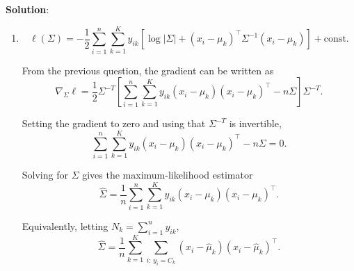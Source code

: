 \documentclass[submit]{harvardml}
\newenvironment{solution}{
    \vspace{2mm}
    \color{blue}\noindent\textbf{Solution}:
}{}
\begin{document}
\begin{solution}
\begin{enumerate}
\[
\frac{\partial}{\partial \Sigma}\log|\Sigma|
=
\Sigma^{-T},
\qquad
\frac{\partial}{\partial \Sigma}
\left[
(x-\mu)^\top \Sigma^{-1}(x-\mu)
\right]
=
-\Sigma^{-T}(x-\mu)(x-\mu)^\top\Sigma^{-T},
\]

we obtain

\[
\nabla_{\Sigma}\ell
=
-\frac{1}{2}
\left[
\sum_{i=1}^{n}\sum_{k=1}^{K}
y_{ik}\Sigma^{-T}
-
\sum_{i=1}^{n}\sum_{k=1}^{K}
y_{ik}
\Sigma^{-T}(x_i-\mu_k)(x_i-\mu_k)^\top\Sigma^{-T}
\right].
\]

Factoring out \(\Sigma^{-T}\),

\[
\nabla_{\Sigma}\ell
=
-\frac{1}{2}
\Sigma^{-T}
\left[
N I
-
\sum_{i=1}^{n}\sum_{k=1}^{K}
y_{ik}(x_i-\mu_k)(x_i-\mu_k)^\top
\Sigma^{-T}
\right].
\]

A cleaner equivalent expression is

\[
\nabla_{\Sigma}\ell
=
\frac{1}{2}
\Sigma^{-T}
\left[
\sum_{i=1}^{n}\sum_{k=1}^{K}
y_{ik}(x_i-\mu_k)(x_i-\mu_k)^\top
-
N\Sigma
\right]
\Sigma^{-T}.
\]

\item \[
\ell(\Sigma)
=
-\frac{1}{2}
\sum_{i=1}^{n}\sum_{k=1}^{K}
y_{ik}
\left[
\log|\Sigma|
+
(x_i-\mu_k)^\top \Sigma^{-1}(x_i-\mu_k)
\right]
+\text{const}.
\]

From the previous question, the gradient can be written as
\[
\nabla_{\Sigma}\ell
=
\frac{1}{2}\Sigma^{-T}
\left[
\sum_{i=1}^{n}\sum_{k=1}^{K}
y_{ik}(x_i-\mu_k)(x_i-\mu_k)^\top
-
n\Sigma
\right]
\Sigma^{-T}.
\]

Setting the gradient to zero and using that \(\Sigma^{-T}\) is invertible,
\[
\sum_{i=1}^{n}\sum_{k=1}^{K}
y_{ik}(x_i-\mu_k)(x_i-\mu_k)^\top
-
n\Sigma
=
0.
\]

Solving for \(\Sigma\) gives the maximum-likelihood estimator
\[
\hat{\Sigma}
=
\frac{1}{n}
\sum_{i=1}^{n}\sum_{k=1}^{K}
y_{ik}(x_i-\mu_k)(x_i-\mu_k)^\top.
\]

Equivalently, letting \(N_k=\sum_{i=1}^{n}y_{ik}\),
\[
\hat{\Sigma}
=
\frac{1}{n}
\sum_{k=1}^{K}
\sum_{i:\,y_i=C_k}
(x_i-\hat{\mu}_k)(x_i-\hat{\mu}_k)^\top.
\] 

	\end{enumerate}
\end{solution}

\newpage
\end{document}
